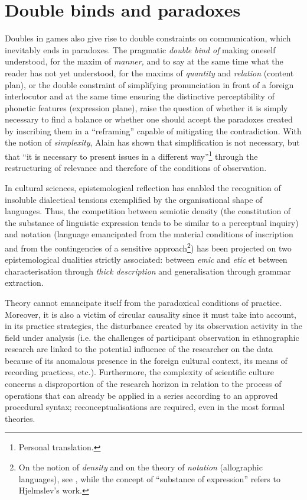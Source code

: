 \documentclass[output=paper]{langscibook}
\begin{document}
\section{Double binds and paradoxes} %

Doubles in games also give rise to double constraints on communication, which inevitably ends in paradoxes. The pragmatic \textit{double bind of} making oneself understood, for the maxim of \textit{manner,} and to say at the same time what the reader has not yet understood, for the maxims of \textit{quantity} and \textit{relation} (content plan), or the double constraint of simplifying pronunciation in front of a foreign interlocutor and at the same time ensuring the distinctive perceptibility of phonetic features (expression plane), raise the question of whether it is simply necessary to find a balance or whether one should accept the paradoxes created by inscribing them in a “reframing” capable of mitigating the contradiction. With the notion of \textit{simplexity}, Alain \citet{Berthoz2009} has shown that simplification is not necessary, but that “it is necessary to present issues in a different way”\footnote{Personal translation.} through the restructuring of relevance and therefore of the conditions of observation. 

In cultural sciences, epistemological reflection has enabled the recognition of insoluble dialectical tensions exemplified by the organisational shape of languages. Thus, the competition between semiotic density (the constitution of the substance of linguistic expression tends to be similar to a perceptual inquiry) and notation (language emancipated from the material conditions of inscription and from the contingencies of a sensitive approach\footnote{On the notion of \textit{density} and on the theory of \textit{notation} (allographic languages), see \citet{Goodman1968}, while the concept of “substance of expression” refers to Hjelmslev's work.}) has been projected on two epistemological dualities strictly associated: between \textit{emic} and \textit{etic} et between characterisation through \textit{thick description} and generalisation through grammar extraction. 

Theory cannot emancipate itself from the paradoxical conditions of practice. Moreover, it is also a victim of circular causality since it must take into account, in its practice strategies, the disturbance created by its observation activity in the field under analysis (i.e. the challenges of participant observation in ethnographic research are linked to the potential influence of the researcher on the data because of its anomalous presence in the foreign cultural context, its means of recording practices, etc.). Furthermore, the complexity of scientific culture concerns a disproportion of the research horizon in relation to the process of operations that can already be applied in a series according to an approved procedural syntax; reconceptualisations are required, even in the most formal theories.
\end{document}
